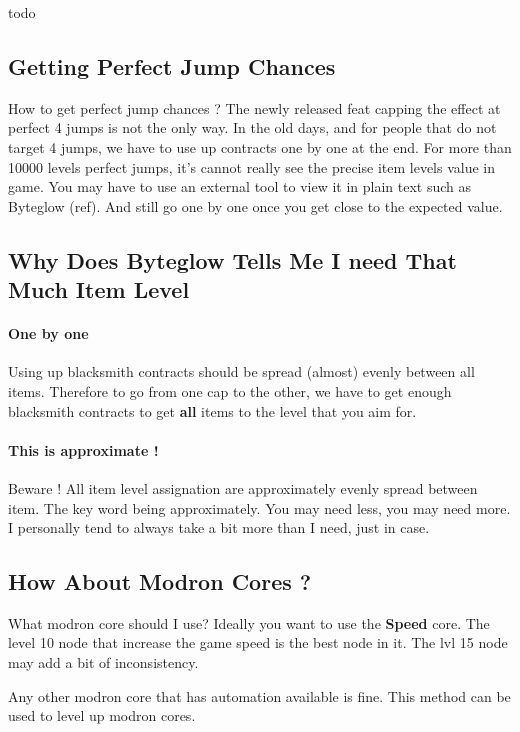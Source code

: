 \documentclass{article}
\begin{document}
todo

\subsection{Getting Perfect Jump Chances}
\label{sec:upgradeIlvl}

How to get perfect jump chances ?
The newly released feat capping the effect at perfect 4 jumps is not the only way.
In the old days, and for people that do not target 4 jumps, we have to use up contracts one by one at the end.
For more than 10000 levels perfect jumps, it's cannot really see the precise item levels value in game.
You may have to use an external tool to view it in plain text such as Byteglow (ref).
And still go one by one once you get close to the expected value.

\subsection{Why Does Byteglow Tells Me I need That Much Item Level}

\paragraph{One by one}

Using up blacksmith contracts should be spread (almost) evenly between all items.
Therefore to go from one cap to the other, we have to get enough blacksmith contracts to get \textbf{all} items to the level that you aim for.

\paragraph{This is approximate !}
Beware !
All item level assignation are approximately evenly spread between item.
The key word being approximately.
You may need less, you may need more.
I personally tend to always take a bit more than I need, just in case.

\subsection{How About Modron Cores ?}

What modron core should I use?
Ideally you want to use the \textbf{Speed} core.
The level 10 node that increase the game speed is the best node in it.
The lvl 15 node may add a bit of inconsistency.

Any other modron core that has automation available is fine.
This method can be used to level up modron cores.
\end{document}
